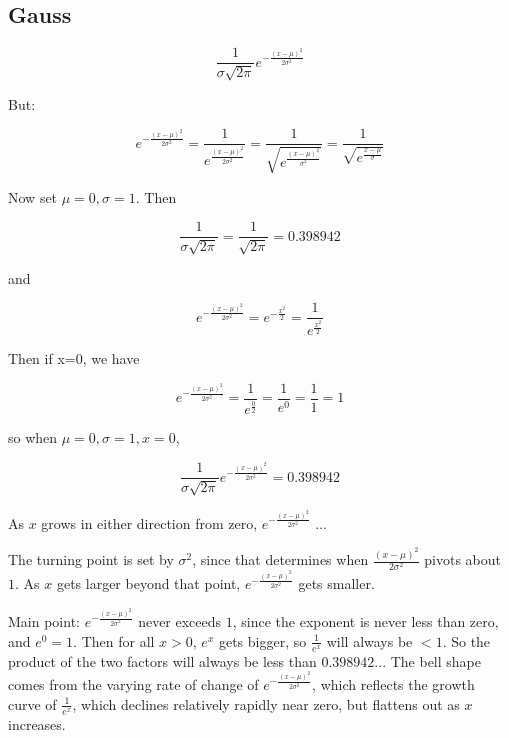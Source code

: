 \documentclass[reqno,12pt]{tufte-book}
\numberwithin{equation}{subsection}
\begin{document}
\subsection{Gauss}

\begin{equation}
  \frac{1}{\sigma\sqrt{2\pi}}e^{-\frac{(x-\mu)^2}{2\sigma^2}}
\end{equation}

But:

\begin{equation}
  e^{-\frac{(x-\mu)^2}{2\sigma^2}} = \frac{1}{e^\frac{(x-\mu)^2}{2\sigma^2}} =
  \frac{1}{\sqrt{e^{\frac{(x-\mu)^2}{\sigma^2}}}} =
  \frac{1}{\sqrt{e^{\frac{x-\mu}{\sigma}}}}
\end{equation}

Now set $\mu=0, \sigma=1$.  Then

\begin{equation}
  \frac{1}{\sigma\sqrt{2\pi}} = \frac{1}{\sqrt{2\pi}} = 0.398942
\end{equation}

and

\begin{equation}
  e^{-\frac{(x-\mu)^2}{2\sigma^2}} =
  e^{-\frac{x^2}{2}} =
  \frac{1}{e^\frac{x^2}{2}}
\end{equation}

Then if x=0, we have

\begin{equation}
  e^{-\frac{(x-\mu)^2}{2\sigma^2}} =
  \frac{1}{e^\frac{0}{2}} =
  \frac{1}{e^0} = \frac{1}{1} = 1
\end{equation}

so when $\mu=0, \sigma=1, x=0$,

\begin{equation}
  \frac{1}{\sigma\sqrt{2\pi}}e^{-\frac{(x-\mu)^2}{2\sigma^2}} = 0.398942
\end{equation}

As $x$ grows in either direction from zero, $e^{-\frac{(x-\mu)^2}{2\sigma^2}}$ ...

The turning point is set by $\sigma^2$, since that determines when
$\frac{(x-\mu)^2}{2\sigma^2}$ pivots about $1$.  As $x$ gets larger beyond that point,
$e^{-\frac{(x-\mu)^2}{2\sigma^2}}$ gets smaller.

Main point: $e^{-\frac{(x-\mu)^2}{2\sigma^2}}$ never exceeds $1$,
since the exponent is never less than zero, and $e^0=1$. Then for all
$x>0$, $e^x$ gets bigger, so $\frac{1}{e^x}$ will always be $<1$.  So
the product of the two factors will always be less than $0.398942...$
The bell shape comes from the varying rate of change of
$e^{-\frac{(x-\mu)^2}{2\sigma^2}}$, which reflects the growth curve of
$\frac{1}{e^x}$, which declines relatively rapidly near zero, but
flattens out as $x$ increases.
\end{document}
